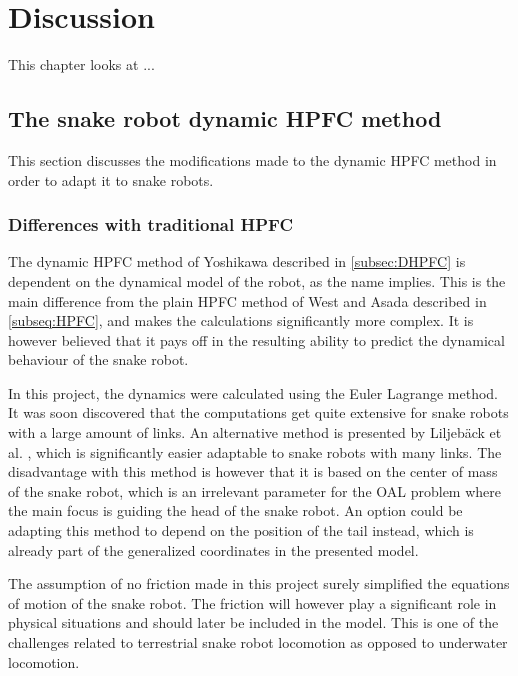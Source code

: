 \chapter{Discussion}\label{ch:discussion}

This chapter looks at ...

\section{The snake robot dynamic HPFC method}

This section discusses the modifications made to the dynamic HPFC method in order to adapt it to snake robots.

\subsection{Differences with traditional HPFC}\label{subsec:dis-diff}

The dynamic HPFC method of Yoshikawa \cite{yoshikawa1987dynamic} described in \ref{subsec:DHPFC} is dependent on the dynamical model of the robot, as the name implies. This is the main difference from the plain HPFC method of West and Asada \cite{west1985method} described in \ref{subseq:HPFC}, and makes the calculations significantly more complex. It is however believed that it pays off in the resulting ability to predict the dynamical behaviour of the snake robot.

In this project, the dynamics were calculated using the Euler Lagrange method. It was soon discovered that the computations get quite extensive for snake robots with a large amount of links. An alternative method is presented by Liljebäck et al. \cite{liljeback2012snake}, which is significantly easier adaptable to snake robots with many links. The disadvantage with this method is however that it is based on the center of mass of the snake robot, which is an irrelevant parameter for the OAL problem where the main focus is guiding the head of the snake robot. An option could be adapting this method to depend on the position of the tail instead, which is already part of the generalized coordinates in the presented model.

The assumption of no friction made in this project surely simplified the equations of motion of the snake robot. The friction will however play a significant role in physical situations and should later be included in the model. This is one of the challenges related to terrestrial snake robot locomotion as opposed to underwater locomotion.

